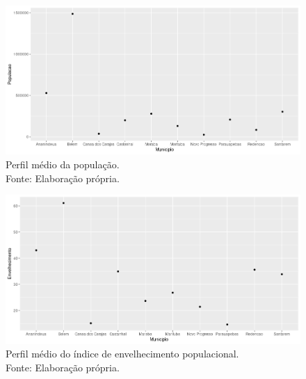 \documentclass[a4paper, 10pt]{article}
\begin{document}
 \begin{figure}[H]
	\centering 
	\includegraphics[scale=0.45]{POPULACAO.png}
	\caption{\centering Perfil médio da população. \\ Fonte: Elaboração própria.}
	\label{}
	\end{figure}

 \begin{figure}[H]
	\centering 
	\includegraphics[scale=0.45]{ENVELHECIMENTO.png}
	\caption{\centering Perfil médio do índice de envelhecimento populacional. \\ Fonte: Elaboração própria.}
	\label{}
	\end{figure}
\end{document}
